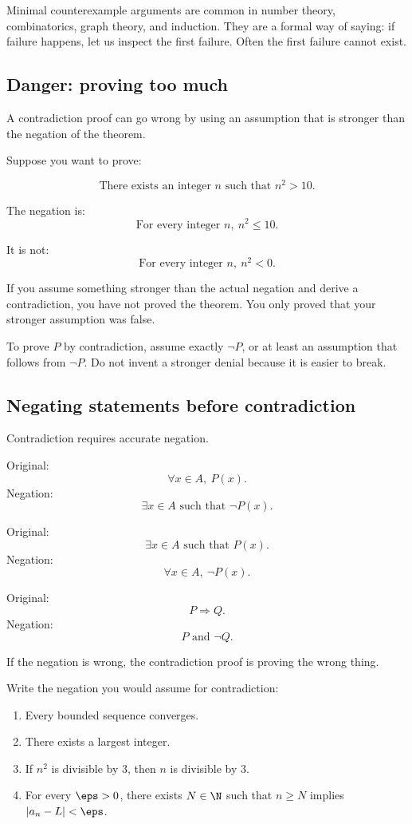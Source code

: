 Minimal counterexample arguments are common in number theory, combinatorics, graph theory, and induction. They are a formal way of saying: if failure happens, let us inspect the first failure. Often the first failure cannot exist.

\subsection{Danger: proving too much}

A contradiction proof can go wrong by using an assumption that is stronger than the negation of the theorem.

Suppose you want to prove:

\[
\text{There exists an integer }n\text{ such that }n^2>10.
\]

The negation is:
\[
\text{For every integer }n,\ n^2\leq10.
\]

It is not:
\[
\text{For every integer }n,\ n^2<0.
\]

If you assume something stronger than the actual negation and derive a contradiction, you have not proved the theorem. You only proved that your stronger assumption was false.

\begin{formalbox}
To prove $P$ by contradiction, assume exactly $\neg P$, or at least an assumption that follows from $\neg P$. Do not invent a stronger denial because it is easier to break.
\end{formalbox}

\subsection{Negating statements before contradiction}

Contradiction requires accurate negation.

Original:
\[
\forall x\in A,\ P(x).
\]
Negation:
\[
\exists x\in A\text{ such that }\neg P(x).
\]

Original:
\[
\exists x\in A\text{ such that }P(x).
\]
Negation:
\[
\forall x\in A,\ \neg P(x).
\]

Original:
\[
P\Rightarrow Q.
\]
Negation:
\[
P\text{ and }\neg Q.
\]

If the negation is wrong, the contradiction proof is proving the wrong thing.

\begin{labbox}
Write the negation you would assume for contradiction:

\begin{enumerate}
\item Every bounded sequence converges.
\item There exists a largest integer.
\item If $n^2$ is divisible by $3$, then $n$ is divisible by $3$.
\item For every $\eps>0$, there exists $N\in\N$ such that $n\geq N$ implies $|a_n-L|<\eps$.
\end{enumerate}
\end{labbox}


